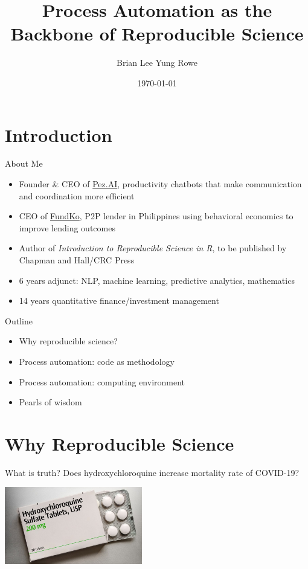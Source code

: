 \documentclass{beamer}
\title{Process Automation as the Backbone of Reproducible Science}
\date{\today}
\author{Brian Lee Yung Rowe}
\institute{Founder \& CEO, Pez.AI\\ CEO, FundKo}
\begin{document}
 
\maketitle 

\section{Introduction} 
\begin{frame}{About Me}

\begin{itemize}
\item Founder \& CEO of \href{https://pez.ai}{Pez.AI}, productivity chatbots that make communication and coordination more efficient
\item CEO of \href{https://fundko.com}{FundKo}, P2P lender in Philippines using behavioral economics to improve lending outcomes
\item Author of \emph{Introduction to Reproducible Science in R}, to be published by Chapman and Hall/CRC Press
\item 6 years adjunct: NLP, machine learning, predictive analytics, mathematics
\item 14 years quantitative finance/investment management
\end{itemize}
\end{frame} 


\begin{frame}{Outline}
\begin{itemize}
\item Why reproducible science?
\item Process automation: code as methodology
\item Process automation: computing environment
\item Pearls of wisdom

\end{itemize} 
\end{frame} 


\section{Why Reproducible Science}

\begin{frame}{What is truth?}
Does hydroxychloroquine increase mortality rate of COVID-19?

\includegraphics[width=6cm]{images/hydroxychloroquine}

\end{frame}
\end{document}

